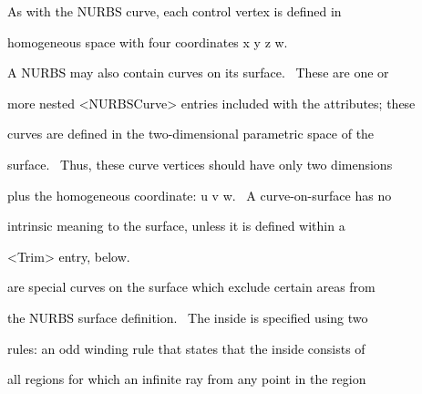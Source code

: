 \documentclass[a4paper]{article}
\newcommand\textstyleOOoComputerKeyWord[1]{\textrm{\textcolor[rgb]{0.0,0.0,0.5019608}{#1}}}
\begin{document}
\bigskip

{\color{black}
\textstyleOOoComputerKeyWord{\textcolor{black}{\ \ As with the NURBS curve, each control vertex is defined in}}}

{\color{black}
\textstyleOOoComputerKeyWord{\textcolor{black}{\ \ homogeneous space with four coordinates x y z w.}}}


\bigskip


\bigskip

{\color{black}
\textstyleOOoComputerKeyWord{\textcolor{black}{\ \ A NURBS may also contain curves on its surface. \ These are one or}}}

{\color{black}
\textstyleOOoComputerKeyWord{\textcolor{black}{\ \ more nested {\textless}NURBSCurve{\textgreater} entries included with
the attributes; these}}}

{\color{black}
\textstyleOOoComputerKeyWord{\textcolor{black}{\ \ curves are defined in the two-dimensional parametric space of the}}}

{\color{black}
\textstyleOOoComputerKeyWord{\textcolor{black}{\ \ surface. \ Thus, these curve vertices should have only two
dimensions}}}

{\color{black}
\textstyleOOoComputerKeyWord{\textcolor{black}{\ \ plus the homogeneous coordinate: u v w. \ A curve-on-surface has
no}}}

{\color{black}
\textstyleOOoComputerKeyWord{\textcolor{black}{\ \ intrinsic meaning to the surface, unless it is defined within a}}}

{\color{black}
\textstyleOOoComputerKeyWord{\textcolor{black}{\ \ {\textless}Trim{\textgreater} entry, below.}}}


\bigskip

\clearpage{\color{black}
\textstyleOOoComputerKeyWord{\textcolor{black}{\ \ Finally, a NURBS may be trimmed by one or more trim curves.
\ These}}}

{\color{black}
\textstyleOOoComputerKeyWord{\textcolor{black}{\ \ are special curves on the surface which exclude certain areas from}}}

{\color{black}
\textstyleOOoComputerKeyWord{\textcolor{black}{\ \ the NURBS surface definition. \ The inside is specified using two}}}

{\color{black}
\textstyleOOoComputerKeyWord{\textcolor{black}{\ \ rules: an odd winding rule that states that the inside consists of}}}

{\color{black}
\textstyleOOoComputerKeyWord{\textcolor{black}{\ \ all regions for which an infinite ray from any point in the region}}}
\end{document}
